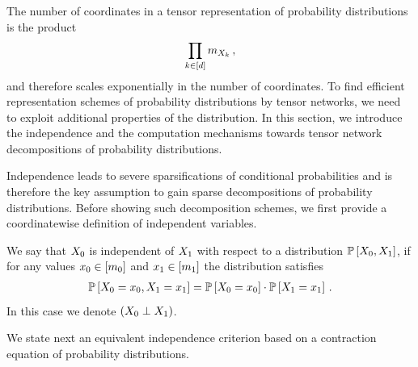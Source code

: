 
The number of coordinates in a tensor representation of probability distributions is the product
\begin{align*}
    \prod_{k\in[d]}m_{X_{k}} \, ,
\end{align*}
and therefore scales exponentially in the number of coordinates.
To find efficient representation schemes of probability distributions by tensor networks, we need to exploit additional properties of the distribution.
In this section, we introduce the independence and the computation mechanisms towards tensor network decompositions of probability distributions.


Independence leads to severe sparsifications of conditional probabilities and is therefore the key assumption to gain sparse decompositions of probability distributions.
Before showing such decomposition schemes, we first provide a coordinatewise definition of independent variables.

\begin{definition}[Independence]
    \label{def:independence}
    We say that $X_{0}$ is independent of $X_{1}$ with respect to a distribution $\mathbb{P}\left[X_{0},X_{1}\right]$, if for any values $x_{0}\in[m_{0}]$ and $x_{1}\in[m_{1}]$ the distribution satisfies
    \begin{align*}
        \mathbb{P}\left[X_{0}=x_{0},X_{1}=x_{1}\right]
        = \mathbb{P}\left[X_{0}=x_{0}\right]\cdot\mathbb{P}\left[X_{1}=x_{1}\right] \, .
    \end{align*}
    In this case we denote $\left(X_{0}\perp X_{1}\right)$.
\end{definition}

We state next an equivalent independence criterion based on a contraction equation of probability distributions.

